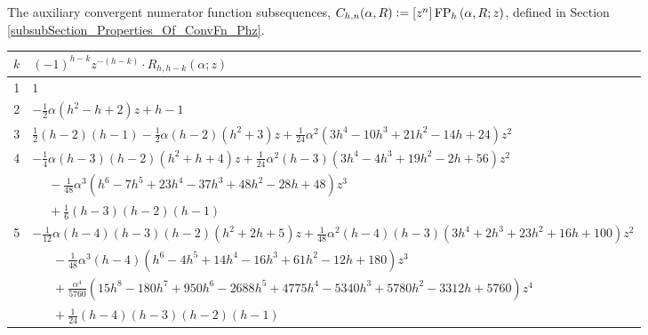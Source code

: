 \documentclass[12pt,reqno]{article}
\numberwithin{sfootnote}{section}
\newcommand{\tabletopstrut}[0]{\rule{0pt}{3ex}}
\numberwithin{equation}{section}
\theoremstyle{DefaultTheoremStyle}
\theoremstyle{definition}
\newcommand{\defequals}{\ensuremath{\vcentcolon=}}
\newcommand{\ConvFP}[4]{\ensuremath{\FP_{#1}\left(#2, #3; #4\right)}}
\DeclareMathOperator{\FP}{FP}
\begin{document}
\begin{table}[h]
\begin{subtable}{\textwidth}
\end{subtable} 

\caption{The auxiliary convergent numerator function subsequences, 
         $C_{h,n}(\alpha, R) \defequals [z^n] \ConvFP{h}{\alpha}{R}{z}$,  
         defined in Section \ref{subsubSection_Properties_Of_ConvFn_Phz}.}
\label{table_ConvNumFnSeqs_Chn_AlphaR_SpCaseListings} 

\end{table} 

\setcounter{subtable}{0} 

\begin{table}[h] 
\centering 

\smaller 

\begin{subtable}{\textwidth} 
\centering 

\begin{tabular}{|c|l|} \hline 
\hline\tabletopstrut 
$k$ & $(-1)^{h-k} z^{-(h-k)} \cdot R_{h,h-k}(\alpha; z)$ \\ \hline 
1 & $1$ \\ 
2 & $-\frac{1}{2} \alpha \left(h^2-h+2\right) z+h-1$ \\ 
3 & $\frac{1}{2} (h-2) (h-1) -\frac{1}{2} \alpha (h-2) 
     \left(h^2+3\right) z+\frac{1}{24} \alpha ^2 
     \left(3 h^4-10 h^3+21 h^2-14 h+24\right) z^2$ \\ 
4 & $-\frac{1}{4} \alpha  (h-3) (h-2) \left(h^2+h+4\right) z + 
     \frac{1}{24} \alpha ^2 (h-3) \left(3 h^4-4 h^3+19 h^2-2 h+56\right) z^2$ \\ 
  & $\phantom{-\frac{1}{4}} - 
     \frac{1}{48} \alpha ^3\left(h^6-7 h^5+23 h^4-37 h^3+48 h^2-28 h+48 
     \right) z^3$ \\ 
  & $\phantom{-\frac{1}{4}} + 
      \frac{1}{6} (h-3) (h-2) (h-1)$ \\ 
5 & $-\frac{1}{12} \alpha  (h-4) (h-3) (h-2) \left(h^2+2 h+5\right) z + 
     \frac{1}{48} \alpha ^2 (h-4) (h-3) \left(3 h^4+2 h^3+23 h^2+16 h+100 
     \right) z^2$ \\ 
  & $\phantom{-\frac{1}{12}} - 
     \frac{1}{48} \alpha ^3 (h-4) 
     \left(h^6-4 h^5+14 h^4-16 h^3+61 h^2-12 h+180\right) z^3$ \\ 
  & $\phantom{-\frac{1}{12}} + 
     \frac{\alpha ^4}{5760} \left(15 h^8-180 h^7+950 h^6-2688 h^5+4775
      h^4-5340 h^3+5780 h^2-3312 h+5760\right) z^4$ \\ 
  & $\phantom{-\frac{1}{12}} + 
     \frac{1}{24} (h-4) (h-3) (h-2) (h-1)$ \\ \hline 

\end{tabular}
\end{subtable}
\end{table}
\end{document}
